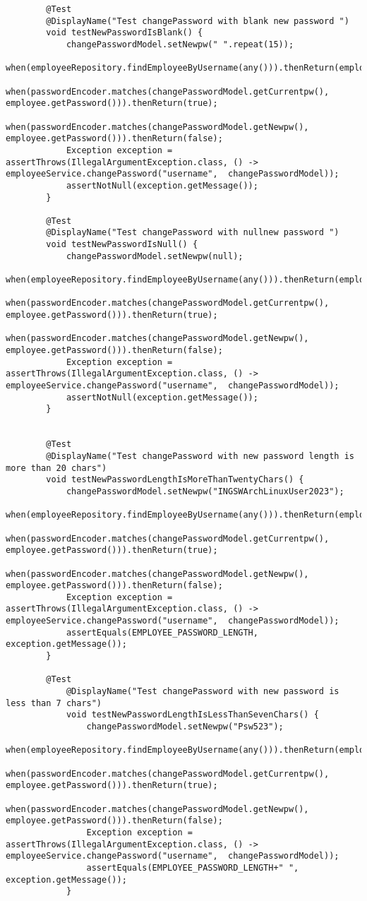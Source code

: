 \begin{verbatim}
		@Test
		@DisplayName("Test changePassword with blank new password ")
		void testNewPasswordIsBlank() {
			changePasswordModel.setNewpw(" ".repeat(15));
			when(employeeRepository.findEmployeeByUsername(any())).thenReturn(employee);
			when(passwordEncoder.matches(changePasswordModel.getCurrentpw(), employee.getPassword())).thenReturn(true);
			when(passwordEncoder.matches(changePasswordModel.getNewpw(), employee.getPassword())).thenReturn(false);
			Exception exception = assertThrows(IllegalArgumentException.class, () -> employeeService.changePassword("username",  changePasswordModel));
			assertNotNull(exception.getMessage());
		}

		@Test
		@DisplayName("Test changePassword with nullnew password ")
		void testNewPasswordIsNull() {
			changePasswordModel.setNewpw(null);
			when(employeeRepository.findEmployeeByUsername(any())).thenReturn(employee);
			when(passwordEncoder.matches(changePasswordModel.getCurrentpw(), employee.getPassword())).thenReturn(true);
			when(passwordEncoder.matches(changePasswordModel.getNewpw(), employee.getPassword())).thenReturn(false);
			Exception exception = assertThrows(IllegalArgumentException.class, () -> employeeService.changePassword("username",  changePasswordModel));
			assertNotNull(exception.getMessage());
		}


		@Test
		@DisplayName("Test changePassword with new password length is more than 20 chars")
		void testNewPasswordLengthIsMoreThanTwentyChars() {
			changePasswordModel.setNewpw("INGSWArchLinuxUser2023");
			when(employeeRepository.findEmployeeByUsername(any())).thenReturn(employee);
			when(passwordEncoder.matches(changePasswordModel.getCurrentpw(), employee.getPassword())).thenReturn(true);
			when(passwordEncoder.matches(changePasswordModel.getNewpw(), employee.getPassword())).thenReturn(false);
			Exception exception = assertThrows(IllegalArgumentException.class, () -> employeeService.changePassword("username",  changePasswordModel));
			assertEquals(EMPLOYEE_PASSWORD_LENGTH, exception.getMessage());
		}

		@Test
			@DisplayName("Test changePassword with new password is less than 7 chars")
			void testNewPasswordLengthIsLessThanSevenChars() {
				changePasswordModel.setNewpw("Psw523");
				when(employeeRepository.findEmployeeByUsername(any())).thenReturn(employee);
				when(passwordEncoder.matches(changePasswordModel.getCurrentpw(), employee.getPassword())).thenReturn(true);
				when(passwordEncoder.matches(changePasswordModel.getNewpw(), employee.getPassword())).thenReturn(false);
				Exception exception = assertThrows(IllegalArgumentException.class, () -> employeeService.changePassword("username",  changePasswordModel));
				assertEquals(EMPLOYEE_PASSWORD_LENGTH+" ", exception.getMessage());
			}


\end{verbatim}
